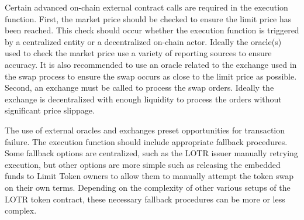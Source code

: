 \documentclass[12pt]{article}
\begin{document}
\begin{center}
            \end{center}
            Certain advanced on-chain external contract calls are required in the execution function. First, the market price should be checked to ensure the limit price has been reached. This check should occur whether the execution function is triggered by a centralized entity or a decentralized on-chain actor. Ideally the oracle(s) used to check the market price use a variety of reporting sources to ensure accuracy. It is also recommended to use an oracle related to the exchange used in the swap process to ensure the swap occurs as close to the limit price as possible. Second, an exchange must be called to process the swap orders. Ideally the exchange is decentralized with enough liquidity to process the orders without significant price slippage.

            The use of external oracles and exchanges preset opportunities for transaction failure. The execution function should include appropriate fallback procedures. Some fallback options are centralized, such as the LOTR issuer manually retrying execution, but other options are more simple such as releasing the embedded funds to Limit Token owners to allow them to manually attempt the token swap on their own terms. Depending on the complexity of other various setups of the LOTR token contract, these necessary fallback procedures can be more or less complex.
            
\end{document}
